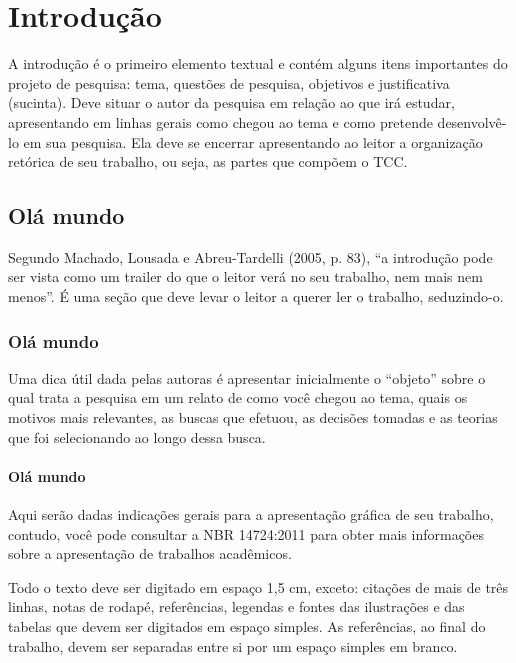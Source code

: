 
\chapter{Introdução}

A introdução é o primeiro elemento textual e contém alguns itens importantes do projeto de pesquisa: tema, questões de pesquisa, objetivos e justificativa (sucinta). Deve situar o autor da pesquisa em relação ao que irá estudar, apresentando em linhas gerais como chegou ao tema e como pretende desenvolvê-lo em sua pesquisa. Ela deve se encerrar apresentando ao leitor a organização retórica de seu trabalho, ou seja, as partes que compõem o TCC.

\section{Olá mundo}

Segundo Machado, Lousada e Abreu-Tardelli (2005, p. 83), “a introdução pode ser vista como um trailer do que o leitor verá no seu trabalho, nem mais nem menos”. É uma seção que deve levar o leitor a querer ler o trabalho, seduzindo-o.

\subsection{Olá mundo}

Uma dica útil dada pelas autoras é apresentar inicialmente o “objeto” sobre o qual trata a pesquisa em um relato de como você chegou ao tema, quais os motivos mais relevantes, as buscas que efetuou, as decisões tomadas e as teorias que foi selecionando ao longo dessa busca. 

\subsubsection{Olá mundo}

Aqui serão dadas indicações gerais para a apresentação gráfica de seu trabalho, contudo, você pode consultar a NBR 14724:2011 para obter mais informações sobre a apresentação de trabalhos acadêmicos.


Todo o texto deve ser digitado em espaço 1,5 cm, exceto: citações de mais de três linhas, notas de rodapé, referências, legendas e fontes das ilustrações e das tabelas que devem ser digitados em espaço simples. As referências, ao final do trabalho, devem ser separadas entre si por um espaço simples em branco.


